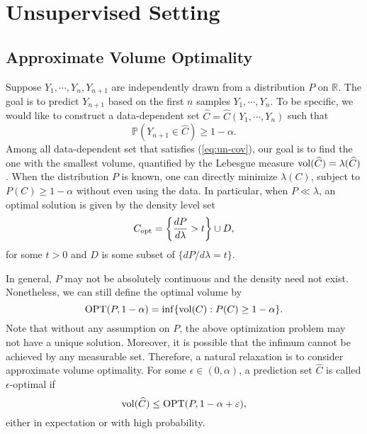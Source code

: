 \section{Unsupervised Setting} \label{sec:unlabeled}


\subsection{Approximate Volume Optimality}

Suppose $Y_1,\cdots,Y_n,Y_{n+1}$ are independently drawn from a distribution $P$ on $\mathbb{R}$. The goal is to predict $Y_{n+1}$ based on the first $n$ samples $Y_1,\cdots,Y_n$. To be specific, we would like to construct a data-dependent set $\widehat{C}=\widehat{C}(Y_1,\cdots,Y_n)$ such that 
\begin{equation}
\mathbb{P}(Y_{n+1}\in \widehat{C})\geq 1-\alpha. \label{eq:un-cov}
\end{equation}
Among all data-dependent set that satisfies (\ref{eq:un-cov}), our goal is to find the one with the smallest volume, quantified by the Lebesgue measure $\mathrm{vol}(\widehat{C})=\lambda(\widehat{C})$.
When the distribution $P$ is known, one can directly minimize $\lambda(C)$, subject to $P(C)\geq 1-\alpha$ without even using the data. In particular, when $P\ll \lambda$, an optimal solution is given by the density level set
$$C_{\rm opt}=\left\{\frac{dP}{d\lambda}>t\right\}\cup D,$$
for some $t>0$ and $D$ is some subset of $\{dP/d\lambda =t\}$.

In general, $P$ may not be absolutely continuous and the density need not exist. Nonetheless, we can still define the optimal volume by
$$\operatorname{OPT}(P,1-\alpha)=\inf\{\mathrm{vol}(C):P(C)\geq 1-\alpha\}.$$
Note that without any assumption on $P$, the above optimization problem may not have a unique solution. Moreover, it is  possible that the infimum cannot be achieved by any measurable set. Therefore, a natural relaxation is to consider approximate volume optimality. For some $\epsilon\in (0,\alpha)$, a prediction set $\widehat{C}$ is called $\epsilon$-optimal if
\begin{equation}
\mathrm{vol}(\widehat{C})\leq \operatorname{OPT}(P,1-\alpha+\varepsilon), \label{eq:un-vol}
\end{equation}
either in expectation or with high probability.

